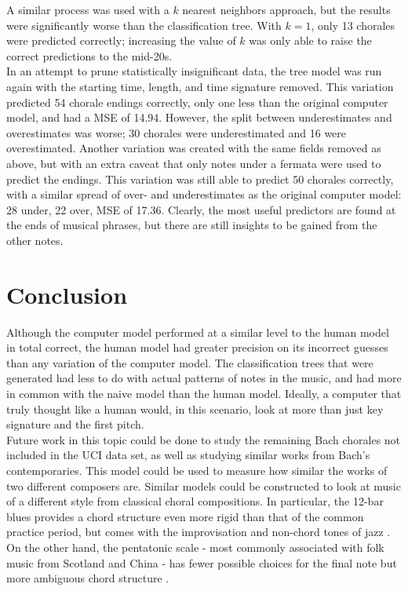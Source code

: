 \documentclass[12pt]{article}
\begin{document}
A similar process was used with a $k$ nearest neighbors approach, but the results were significantly worse than the classification tree. With $k=1$, only 13 chorales were predicted correctly; increasing the value of $k$ was only able to raise the correct predictions to the mid-20s.\\

In an attempt to prune statistically insignificant data, the tree model was run again with the starting time, length, and time signature removed. This variation predicted 54 chorale endings correctly, only one less than the original computer model, and had a MSE of 14.94. However, the split between underestimates and overestimates was worse; 30 chorales were underestimated and 16 were overestimated. Another variation was created with the same fields removed as above, but with an extra caveat that only notes under a fermata were used to predict the endings. This variation was still able to predict 50 chorales correctly, with a similar spread of over- and underestimates as the original computer model: 28 under, 22 over, MSE of 17.36. Clearly, the most useful predictors are found at the ends of musical phrases, but there are still insights to be gained from the other notes.
\section{Conclusion}
Although the computer model performed at a similar level to the human model in total correct, the human model had greater precision on its incorrect guesses than any variation of the computer model. The classification trees that were generated had less to do with actual patterns of notes in the music, and had more in common with the naive model than the human model. Ideally, a computer that truly thought like a human would, in this scenario, look at more than just key signature and the first pitch.\\

Future work in this topic could be done to study the remaining Bach chorales not included in the UCI data set, as well as studying similar works from Bach's contemporaries. This model could be used to measure how similar the works of two different composers are. Similar models could be constructed to look at music of a different style from classical choral compositions. In particular, the 12-bar blues provides a chord structure even more rigid than that of the common practice period, but comes with the improvisation and non-chord tones of jazz \cite{music_dict}. On the other hand, the pentatonic scale - most commonly associated with folk music from Scotland and China - has fewer possible choices for the final note but more ambiguous chord structure \cite{music_dict}.\\
\end{document}
